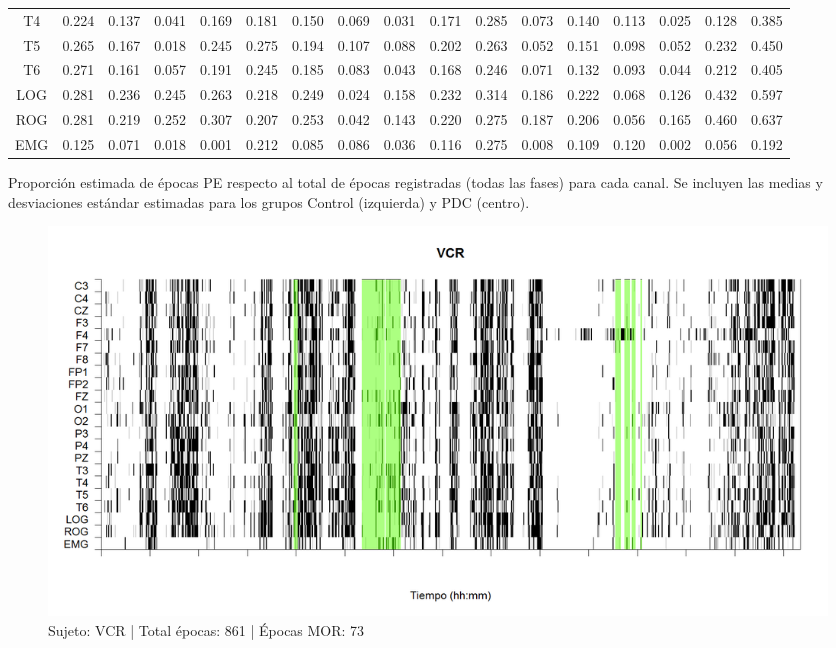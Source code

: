 \begin{SidewaysFigure}
\begin{tabular}{c||ccccc|cc||cccc|cc||ccc}
T4&0.224&0.137&0.041&0.169&0.181&0.150&0.069&0.031&0.171&0.285&0.073&0.140&0.113&0.025&0.128&0.385 \\
T5&0.265&0.167&0.018&0.245&0.275&0.194&0.107&0.088&0.202&0.263&0.052&0.151&0.098&0.052&0.232&0.450 \\
T6&0.271&0.161&0.057&0.191&0.245&0.185&0.083&0.043&0.168&0.246&0.071&0.132&0.093&0.044&0.212&0.405 \\
LOG&0.281&0.236&0.245&0.263&0.218&0.249&0.024&0.158&0.232&0.314&0.186&0.222&0.068&0.126&0.432&0.597 \\
ROG&0.281&0.219&0.252&0.307&0.207&0.253&0.042&0.143&0.220&0.275&0.187&0.206&0.056&0.165&0.460&0.637 \\
EMG&0.125&0.071&0.018&0.001&0.212&0.085&0.086&0.036&0.116&0.275&0.008&0.109&0.120&0.002&0.056&0.192
\end{tabular}
\caption{Proporci\'on estimada de \'epocas PE respecto al total de \'epocas registradas
(todas las fases) para cada
canal. Se incluyen las medias y desviaciones est\'andar estimadas para los grupos 
Control (izquierda) y PDC (centro).}
\label{gpos_total}
\end{SidewaysFigure}


\begin{figure}
\centering
\includegraphics[width=\linewidth]
{./complementario170409/VCNNS1_est.png} 
\caption{Sujeto: VCR | Total \'epocas: 861 | \'Epocas MOR: 73
}
\label{grf_VCR}
\end{figure}


